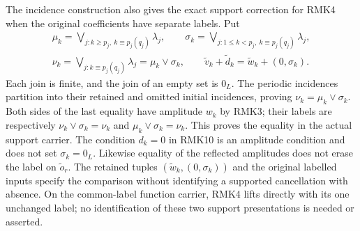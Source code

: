 The incidence construction also gives the exact support correction
for RMK4 when the original coefficients have separate labels.
Put
\begin{equation}\tag{RMK32}
\begin{gathered}
 \mu_k=\bigvee_{j:k\geq p_j,\ k\equiv p_j(q_j)}\lambda_j,
 \qquad
 \sigma_k=\bigvee_{j:1\leq k<p_j,\ k\equiv p_j(q_j)}\lambda_j,\\
 \nu_k=\bigvee_{j:k\equiv p_j(q_j)}\lambda_j
       =\mu_k\vee\sigma_k,\qquad
 \widetilde v_k+\widetilde d_k
       =\widetilde w_k+(0,\sigma_k).
\end{gathered}
\end{equation}
Each join is finite, and the join of an empty set is $0_L$.
The periodic incidences partition into their retained and omitted
initial incidences, proving $\nu_k=\mu_k\vee\sigma_k$. Both sides
of the last equality have amplitude $w_k$ by RMK3; their labels
are respectively $\nu_k\vee\sigma_k=\nu_k$ and
$\mu_k\vee\sigma_k=\nu_k$. This proves the equality in the actual
support carrier. The condition $d_k=0$ in RMK10 is an amplitude
condition and does not set $\sigma_k=0_L$. Likewise equality of
the reflected amplitudes does not erase the label on
$\widetilde o_r$. The retained tuples $(\widetilde w_k,(0,\sigma_k))$
and the original labelled inputs specify the comparison without
identifying a supported cancellation with absence. On the
common-label function carrier, RMK4 lifts directly with its one
unchanged label; no identification of these two support
presentations is needed or asserted.

